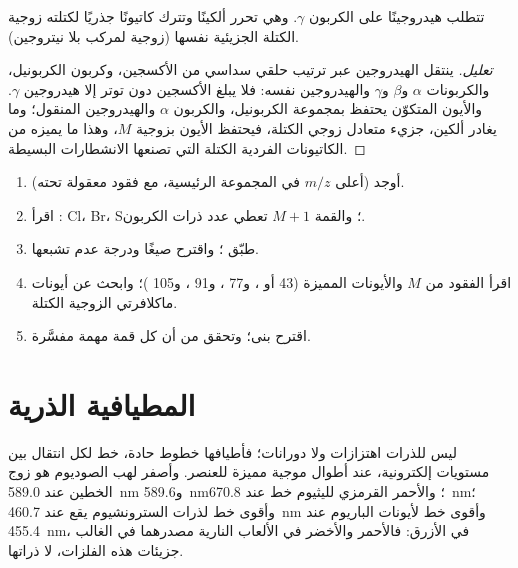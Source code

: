 \begin{proposition}\label{prop:b2:mass-spec-atomic:mclafferty}
تتطلب  هيدروجينًا على الكربون $\gamma$. وهي تحرر ألكينًا وتترك
كاتيونًا جذريًا لكتلته زوجية الكتلة الجزيئية نفسها (زوجية لمركب بلا
نيتروجين).
\end{proposition}

\begin{proof}[تعليل]
ينتقل الهيدروجين عبر ترتيب حلقي سداسي من الأكسجين، وكربون الكربونيل،
والكربونات $\alpha$ و$\beta$ و$\gamma$ والهيدروجين نفسه: فلا يبلغ الأكسجين دون توتر إلا هيدروجين $\gamma$.
والأيون المتكوّن يحتفظ بمجموعة الكربونيل، والكربون $\alpha$ 
والهيدروجين المنقول؛ وما يغادر ألكين، جزيء متعادل زوجي الكتلة، فيحتفظ الأيون بزوجية
$M$، وهذا ما يميزه من الكاتيونات الفردية الكتلة التي تصنعها الانشطارات البسيطة.
\end{proof}

\begin{method}\label{met:b2:mass-spec-atomic:read-ms}
\begin{enumerate}
  \item أوجد  (أعلى $m/z$ في المجموعة الرئيسية، مع فقود معقولة تحته).
  \item اقرأ : Cl، Br، S؛ والقمة $M+1$ تعطي عدد ذرات الكربون.
  \item طبّق ؛ واقترح صيغًا ودرجة عدم تشبعها.
  \item اقرأ الفقود من $M$ والأيونات المميزة (43  أو ، و77
        ، و91 ، و105 )؛ وابحث عن أيونات ماكلافرتي الزوجية الكتلة.
  \item اقترح بنى؛ وتحقق من أن كل قمة مهمة مفسَّرة.
\end{enumerate}
\end{method}

\section{المطيافية الذرية}

ليس للذرات اهتزازات ولا دورانات؛ فأطيافها خطوط حادة، خط لكل انتقال بين
مستويات إلكترونية، عند أطوال موجية مميزة للعنصر. وأصفر لهب الصوديوم هو
زوج الخطين عند \qty{589.0}{nm} و\qty{589.6}{nm}؛ والأحمر القرمزي لليثيوم خط عند \qty{670.8}{nm}؛
وأقوى خط لذرات السترونشيوم يقع عند \qty{460.7}{nm} وأقوى خط لأيونات الباريوم عند
\qty{455.4}{nm}، في الأزرق: فالأحمر والأخضر في الألعاب النارية مصدرهما في الغالب جزيئات هذه
الفلزات، لا ذراتها.

